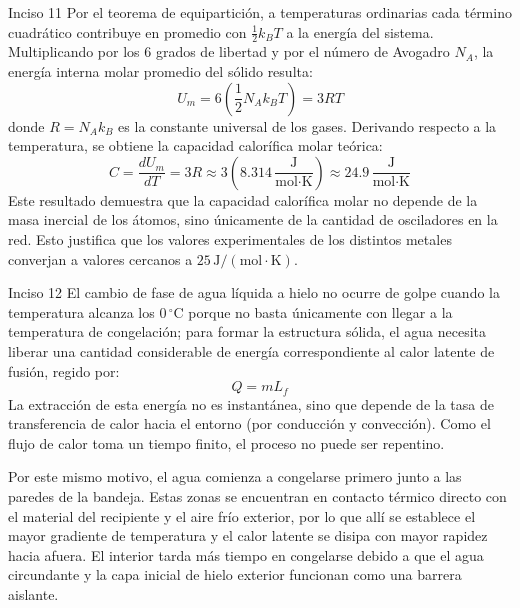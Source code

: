 \documentclass[11pt,letterpaper]{article}
\begin{document}
\begin{inciso}{Inciso 11}
Por el teorema de equipartición, a temperaturas ordinarias cada término cuadrático contribuye en promedio con $\frac{1}{2} k_B T$ a la energía del sistema. Multiplicando por los 6 grados de libertad y por el número de Avogadro $N_A$, la energía interna molar promedio del sólido resulta:
\[
U_m = 6 \left( \frac{1}{2} N_A k_B T \right) = 3 R T
\]
donde $R = N_A k_B$ es la constante universal de los gases. Derivando respecto a la temperatura, se obtiene la capacidad calorífica molar teórica:
\[
C = \frac{dU_m}{dT} = 3R \approx 3 \left(8.314 \, \frac{\text{J}}{\text{mol}\cdot\text{K}}\right) \approx 24.9 \, \frac{\text{J}}{\text{mol}\cdot\text{K}}
\]
Este resultado demuestra que la capacidad calorífica molar no depende de la masa inercial de los átomos, sino únicamente de la cantidad de osciladores en la red. Esto justifica que los valores experimentales de los distintos metales converjan a valores cercanos a $25 \, \text{J}/(\text{mol}\cdot\text{K})$.
\end{inciso}
\begin{inciso}{Inciso 12}
El cambio de fase de agua líquida a hielo no ocurre de golpe cuando la temperatura alcanza los $0\,^{\circ}\mathrm{C}$ porque no basta únicamente con llegar a la temperatura de congelación; para formar la estructura sólida, el agua necesita liberar una cantidad considerable de energía correspondiente al calor latente de fusión, regido por:
\[
Q = m L_f
\]
La extracción de esta energía no es instantánea, sino que depende de la tasa de transferencia de calor hacia el entorno (por conducción y convección). Como el flujo de calor toma un tiempo finito, el proceso no puede ser repentino.

Por este mismo motivo, el agua comienza a congelarse primero junto a las paredes de la bandeja. Estas zonas se encuentran en contacto térmico directo con el material del recipiente y el aire frío exterior, por lo que allí se establece el mayor gradiente de temperatura y el calor latente se disipa con mayor rapidez hacia afuera. El interior tarda más tiempo en congelarse debido a que el agua circundante y la capa inicial de hielo exterior funcionan como una barrera aislante.
\end{inciso}
\end{document}
